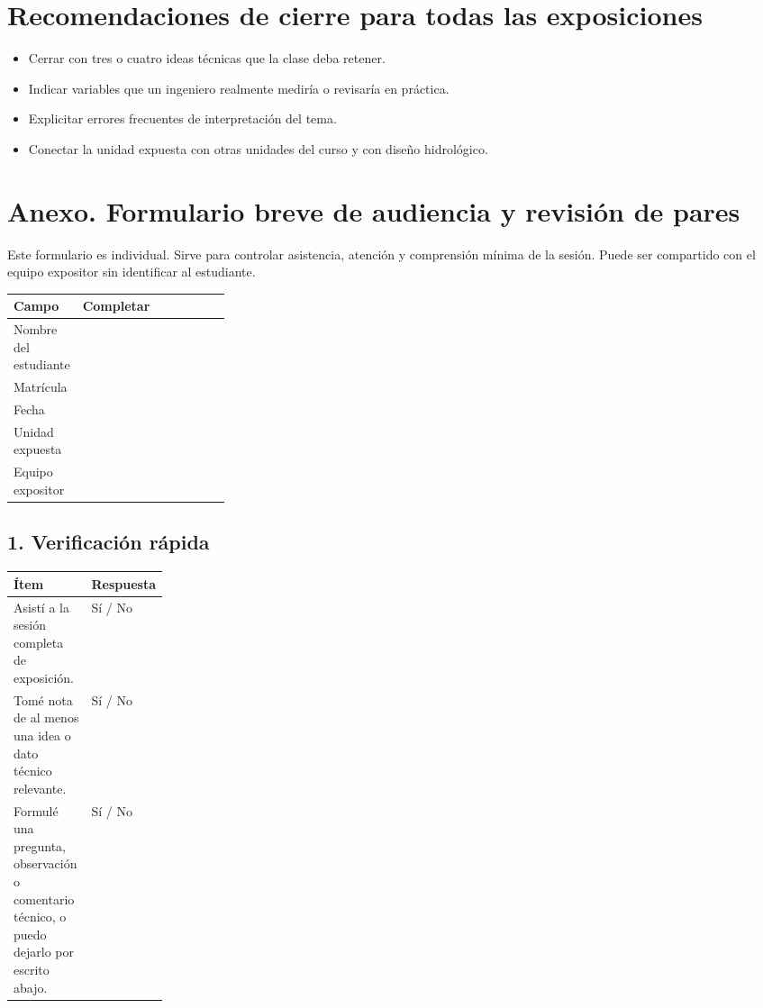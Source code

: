\documentclass[11pt]{article}
\begin{document}
\section{Recomendaciones de cierre para todas las exposiciones}
\begin{itemize}
\item Cerrar con tres o cuatro ideas técnicas que la clase deba retener.
\item Indicar variables que un ingeniero realmente mediría o revisaría en práctica.
\item Explicitar errores frecuentes de interpretación del tema.
\item Conectar la unidad expuesta con otras unidades del curso y con diseño hidrológico.
\end{itemize}

\appendix
\section{Anexo. Formulario breve de audiencia y revisión de pares}
\begin{infobox}
Este formulario es individual. Sirve para controlar asistencia, atención y comprensión mínima de la sesión. Puede ser compartido con el equipo expositor sin identificar al estudiante.
\end{infobox}

\begin{tabularx}{\linewidth}{p{0.28\linewidth} Y}
\toprule
\textbf{Campo} & \textbf{Completar} \\
\midrule
Nombre del estudiante & \\
Matrícula & \\
Fecha & \\
Unidad expuesta & \\
Equipo expositor & \\
\bottomrule
\end{tabularx}

\subsection*{1. Verificación rápida}
\begin{tabularx}{\linewidth}{Y p{0.20\linewidth}}
\toprule
\textbf{Ítem} & \textbf{Respuesta} \\
\midrule
Asistí a la sesión completa de exposición. & Sí / No \\
Tomé nota de al menos una idea o dato técnico relevante. & Sí / No \\
Formulé una pregunta, observación o comentario técnico, o puedo dejarlo por escrito abajo. & Sí / No \\
\bottomrule
\end{tabularx}
\end{document}
